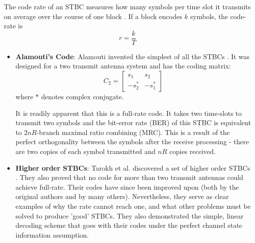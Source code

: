 The code rate of an STBC measures how many symbols per time slot it
transmits on average over the course of one block \cite{17}. If a
block encodes $k$ symbols, the code-rate is
\[r=\frac{k}{T}\]
\begin{itemize}
\item {\bf Alamouti's Code}: Alamouti invented the simplest of all the STBCs \cite{11}. It was designed for a two transmit antenna system and has the coding matrix:
\[C_2=
\left[\begin{array}{cc}
s_1 & s_2\\
-s_2^* & -s_1^*
\end{array} \right]\]
where $*$ denotes complex conjugate.

It is readily apparent that this is a full-rate code. It takes two
time-slots to transmit two symbols and the bit-error rate (BER) of
this STBC is equivalent to $2nR$-branch maximal ratio combining
(MRC). This is a result of the perfect orthogonality between the
symbols after the receive processing - there are two copies of each
symbol transmitted and $nR$ copies received.

\item {\bf Higher order STBCs}: Tarokh et al. discovered a set of higher order STBCs \cite{17, 18}. They also proved that no code for more than two transmit antennas could achieve full-rate. Their codes have since been improved upon (both by the original authors and by many others). Nevertheless, they serve as clear examples of why the rate cannot reach one, and what other problems must be solved to produce 'good' STBCs. They also demonstrated the simple, linear decoding scheme that goes with their codes under the perfect channel state information assumption.


\end{itemize}
